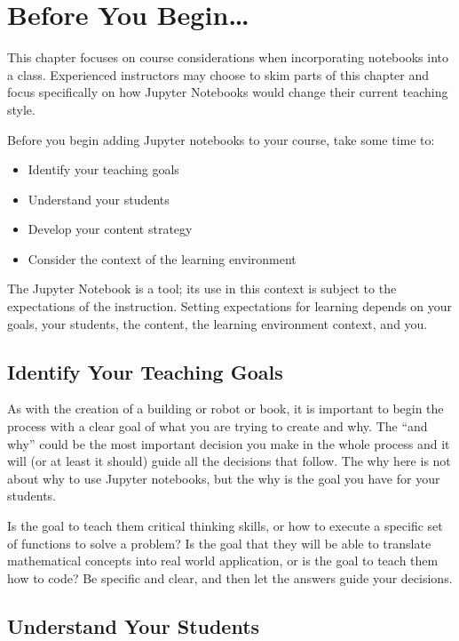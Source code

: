 \documentclass[]{book}
\providecommand{\tightlist}{%
  \setlength{\itemsep}{0pt}\setlength{\parskip}{0pt}}
\begin{document}
\section{Before You Begin\ldots{}}\label{before-you-begin}

This chapter focuses on course considerations when incorporating
notebooks into a class. Experienced instructors may choose to skim parts
of this chapter and focus specifically on how Jupyter Notebooks would
change their current teaching style.

Before you begin adding Jupyter notebooks to your course, take some time
to:

\begin{itemize}
\tightlist
\item
  Identify your teaching goals
\item
  Understand your students
\item
  Develop your content strategy
\item
  Consider the context of the learning environment
\end{itemize}

The Jupyter Notebook is a tool; its use in this context is subject to
the expectations of the instruction. Setting expectations for learning
depends on your goals, your students, the content, the learning
environment context, and you.

\subsection{Identify Your Teaching
Goals}\label{identify-your-teaching-goals}

As with the creation of a building or robot or book, it is important to
begin the process with a clear goal of what you are trying to create and
why. The ``and why'' could be the most important decision you make in
the whole process and it will (or at least it should) guide all the
decisions that follow. The why here is not about why to use Jupyter
notebooks, but the why is the goal you have for your students.

Is the goal to teach them critical thinking skills, or how to execute a
specific set of functions to solve a problem? Is the goal that they will
be able to translate mathematical concepts into real world application,
or is the goal to teach them how to code? Be specific and clear, and
then let the answers guide your decisions.

\subsection{Understand Your Students}\label{understand-your-students}
\end{document}
